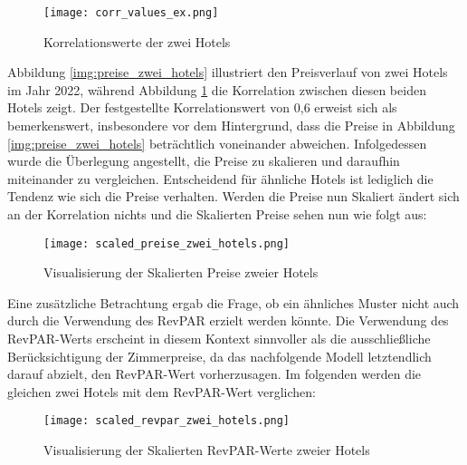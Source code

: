 \begin{figure}[h]
    \centering
    \texttt{[image: corr\_values\_ex.png]}
    \caption[Korrelationswerte der zwei Hotels]{Korrelationswerte der zwei Hotels}
    \label{img:corr_values_ex}
\end{figure}

Abbildung \ref{img:preise_zwei_hotels} illustriert den Preisverlauf von zwei Hotels im Jahr 2022, während Abbildung \ref{img:corr_values_ex} die Korrelation zwischen diesen beiden Hotels zeigt. Der festgestellte Korrelationswert von 0,6 erweist sich als bemerkenswert, insbesondere vor dem Hintergrund, dass die Preise in Abbildung \ref{img:preise_zwei_hotels} beträchtlich voneinander abweichen. Infolgedessen wurde die Überlegung angestellt, die Preise zu skalieren und daraufhin miteinander zu vergleichen. Entscheidend für ähnliche Hotels ist lediglich die Tendenz wie sich die Preise verhalten. 
\newline
\newline
Werden die Preise nun Skaliert ändert sich an der Korrelation nichts und die Skalierten Preise sehen nun wie folgt aus:

\begin{figure}[h]
    \centering
    \texttt{[image: scaled\_preise\_zwei\_hotels.png]}
    \caption[Visualisierung der Skalierten Preise zweier Hotels]{Visualisierung der Skalierten Preise zweier Hotels}
    \label{img:scaled_preise_zwei_hotels}
\end{figure}

Eine zusätzliche Betrachtung ergab die Frage, ob ein ähnliches Muster nicht auch durch die Verwendung des RevPAR erzielt werden könnte. Die Verwendung des RevPAR-Werts erscheint in diesem Kontext sinnvoller als die ausschließliche Berücksichtigung der Zimmerpreise, da das nachfolgende Modell letztendlich darauf abzielt, den RevPAR-Wert vorherzusagen.
\newline
\newline
Im folgenden werden die gleichen zwei Hotels mit dem RevPAR-Wert verglichen:

\begin{figure}[h]
    \centering
    \texttt{[image: scaled\_revpar\_zwei\_hotels.png]}
    \caption[Visualisierung der Skalierten RevPAR-Werte zweier Hotels]{Visualisierung der Skalierten RevPAR-Werte zweier Hotels}
    \label{img:scaled_revpar_zwei_hotels}
\end{figure}

